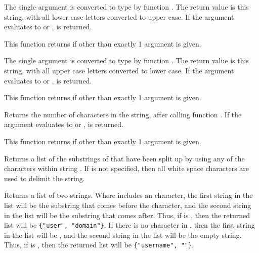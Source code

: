 \begin{description}
  \item[\Code{String toUpper(AnyType Expr)}]
    The single argument is converted to type  by function .
    The return value is this string, with all lower case letters converted to
    upper case.
    If the argument evaluates to  or ,
     is returned.

    This function returns  if other than exactly 1
    argument is given.

  \item[\Code{String toLower(AnyType Expr)}]
    The single argument is converted to type  by function .
    The return value is this string, with all upper case letters converted to
    lower case.
    If the argument evaluates to  or ,
     is returned.

    This function returns  if other than exactly 1
    argument is given.

  \item[\Code{Integer size(AnyType Expr)}]
    Returns the number of characters in the string, after calling function
    .
    If the argument evaluates to  or ,
     is returned.

    This function returns  if other than exactly 1
    argument is given.

  \item[\Code{List split(String s \Lbr\ , String tokens \Rbr\ )}]
    Returns a list of the substrings of  that have been split up
    by using any of the characters within string .
    If  is not specified, then all white space characters are
    used to delimit the string.

  \item[\Code{List splitUserName(String Name)}]
    Returns a list of two strings.
    Where  includes an  character,
    the first string in the list will be the substring that comes before
    the  character, 
    and the second string in the list will be the substring that comes after.
    Thus, if  is , 
    then the returned list will be \verb|{"user", "domain"}|.
    If there is no  character in ,
    then the first string in the list will be , and the
    second string in the list will be the empty string.
    Thus, if  is , then the returned list
    will be \verb|{"username", ""}|.


\end{description}
